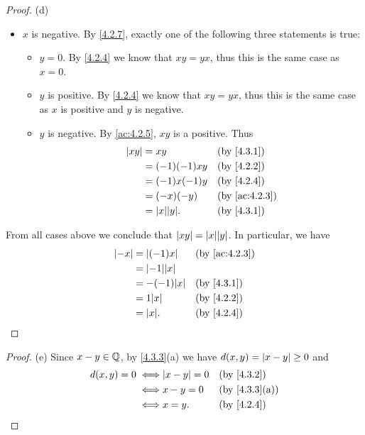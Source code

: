 \begin{proof}{(d)}
\begin{itemize}
\begin{itemize}
          \end{itemize}
    \item \(x\) is negative.
          By \cref{4.2.7}, exactly one of the following three statements is true:
          \begin{itemize}
            \item \(y = 0\).
                  By \cref{4.2.4} we know that \(xy = yx\), thus this is the same case as \(x = 0\).
            \item \(y\) is positive.
                  By \cref{4.2.4} we know that \(xy = yx\), thus this is the same case as \(x\) is positive and \(y\) is negative.
            \item \(y\) is negative.
                  By \cref{ac:4.2.5}, \(xy\) is a positive.
                  Thus
                  \begin{align*}
                    \abs{xy} & = xy               &  & \by{4.3.1}    \\
                             & = (-1)(-1)xy       &  & \by{4.2.2}    \\
                             & = (-1)x(-1)y       &  & \by{4.2.4}    \\
                             & = (-x)(-y)         &  & \by{ac:4.2.3} \\
                             & = \abs{x} \abs{y}. &  & \by{4.3.1}
                  \end{align*}
          \end{itemize}
  \end{itemize}
  From all cases above we conclude that \(\abs{xy} = \abs{x} \abs{y}\).
  In particular, we have
  \begin{align*}
    \abs{-x} & = \abs{(-1)x}      &  & \by{ac:4.2.3} \\
             & = \abs{-1} \abs{x}                    \\
             & = -(-1) \abs{x}    &  & \by{4.3.1}    \\
             & = 1 \abs{x}        &  & \by{4.2.2}    \\
             & = \abs{x}.         &  & \by{4.2.4}
  \end{align*}
\end{proof}

\begin{proof}{(e)}
  Since \(x - y \in \mathbb{Q}\), by \cref{4.3.3}(a) we have \(d(x, y) = \left\lvert x - y\right\rvert \geq 0\) and
  \begin{align*}
    d(x, y) = 0
    \iff & \abs{x - y} = 0 &  & \by{4.3.2}                  \\
    \iff & x - y = 0       &  & \text{(by \cref{4.3.3}(a))} \\
    \iff & x = y.          &  & \by{4.2.4}
  \end{align*}
\end{proof}

